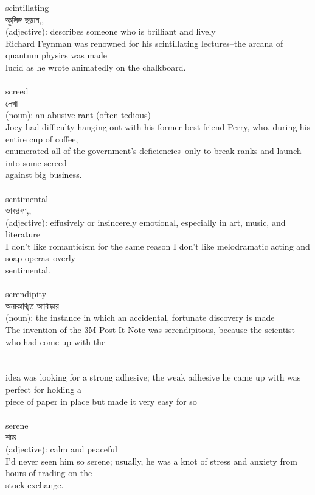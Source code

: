 \documentclass{article}
\begin{document}
{scintillating}\\
{স্ফুলিঙ্গ ছড়ান,,}\\
{(adjective): describes someone who is brilliant and lively\\Richard Feynman was renowned for his scintillating lectures--the arcana of quantum physics was made\\lucid as he wrote animatedly on the chalkboard.\\}\\
{screed}\\
{লেখা}\\
{(noun): an abusive rant (often tedious)\\Joey had difficulty hanging out with his former best friend Perry, who, during his entire cup of coffee,\\enumerated all of the government's deficiencies--only to break ranks and launch into some screed\\against big business.\\}\\
{sentimental}\\
{ভাবপ্রবণ,,}\\
{(adjective): effusively or insincerely emotional, especially in art, music, and literature\\I don't like romanticism for the same reason I don't like melodramatic acting and soap operas--overly\\sentimental.\\}\\
{serendipity}\\
{অনাকাঙ্খিত আবিস্কার}\\
{(noun): the instance in which an accidental, fortunate discovery is made\\The invention of the 3M Post It Note was serendipitous, because the scientist who had come up with the\\\\                                                                               \\idea was looking for a strong adhesive; the weak adhesive he came up with was perfect for holding a\\piece of paper in place but made it very easy for so\\}\\
{serene}\\
{শান্ত}\\
{(adjective): calm and peaceful\\I'd never seen him so serene; usually, he was a knot of stress and anxiety from hours of trading on the\\stock exchange.\\}\\
\end{document}
